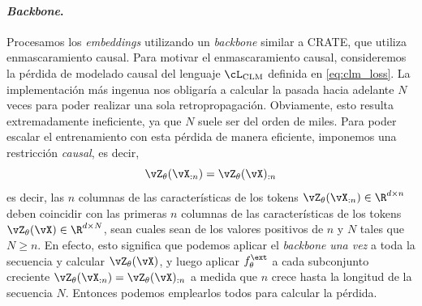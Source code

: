 \documentclass[../../book-main_es.tex]{subfiles}
\begin{document}
\paragraph{\textit{Backbone}.} Procesamos los \textit{embeddings} utilizando un \textit{backbone} similar a CRATE,
que utiliza enmascaramiento causal. Para motivar el enmascaramiento causal,
consideremos la pérdida de modelado causal del lenguaje \(\cL_{\mathrm{CLM}}\)
definida en \eqref{eq:clm_loss}. La implementación más ingenua nos obligaría
a calcular la pasada hacia adelante \(N\) veces para poder
realizar una sola retropropagación. Obviamente, esto resulta extremadamente ineficiente, ya que
\(N\) suele ser del orden de miles. Para poder escalar el entrenamiento con
esta pérdida de manera eficiente, imponemos una restricción \textit{causal}, es decir,
\begin{equation}\label{eq:causal_backbone_def}
\vZ_{\theta}(\vX_{:n}) = \vZ_{\theta}(\vX)_{:n}
\end{equation}
es decir, las \(n\) columnas de las características de los tokens
\(\vZ_{\theta}(\vX_{:n}) \in \R^{d \times n}\) deben coincidir con
las primeras \(n\) columnas de las características de los tokens \(\vZ_{\theta}(\vX) \in
\R^{d \times N}\), sean cuales sean de los valores positivos de \(n\) y
\(N\) tales que \(N \geq n\). En efecto, esto significa que podemos aplicar el
\textit{backbone} \textit{una vez} a toda la secuencia y calcular
\(\vZ_{\theta}(\vX)\), y luego aplicar \(f_{\theta}^{\ext}\) a cada
subconjunto creciente \(\vZ_{\theta}(\vX_{:n}) = \vZ_{\theta}(\vX)_{:n}\)
a medida que \(n\) crece hasta la longitud de la secuencia \(N\). Entonces podemos emplearlos todos
para calcular la pérdida.
\end{document}
